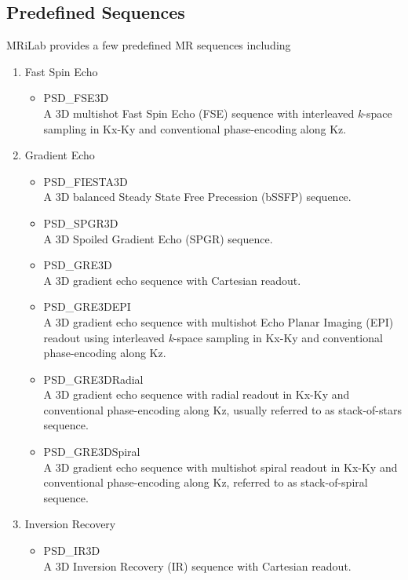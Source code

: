 \documentclass{book}%
\begin{document}
\subsection{Predefined Sequences}
MRiLab provides a few predefined MR sequences including

\begin{enumerate}
	\item Fast Spin Echo 
	
	\begin{itemize}
	\item PSD\_FSE3D \\
	A 3D multishot Fast Spin Echo (FSE) sequence with interleaved \textit{k}-space sampling in Kx-Ky and conventional phase-encoding along Kz. 
\end{itemize}

\item Gradient Echo

\begin{itemize}
	\item PSD\_FIESTA3D \\
	A 3D balanced Steady State Free Precession (bSSFP) sequence.
	\item PSD\_SPGR3D \\
	A 3D Spoiled Gradient Echo (SPGR) sequence.
	\item PSD\_GRE3D \\
	A 3D gradient echo sequence with Cartesian readout.
	\item PSD\_GRE3DEPI \\
	A 3D gradient echo sequence with multishot Echo Planar Imaging (EPI) readout using interleaved \textit{k}-space sampling in Kx-Ky and conventional phase-encoding along Kz. 
	\item PSD\_GRE3DRadial \\
	A 3D gradient echo sequence with radial readout in Kx-Ky and conventional phase-encoding along Kz, usually referred to as stack-of-stars sequence.
	\item PSD\_GRE3DSpiral \\
	A 3D gradient echo sequence with multishot spiral readout in Kx-Ky and conventional phase-encoding along Kz, referred to as stack-of-spiral sequence. 
\end{itemize}

\item Inversion Recovery
\begin{itemize}
	\item PSD\_IR3D \\
	A 3D Inversion Recovery (IR) sequence with Cartesian readout.
\end{itemize}


\end{enumerate}
\end{document}
